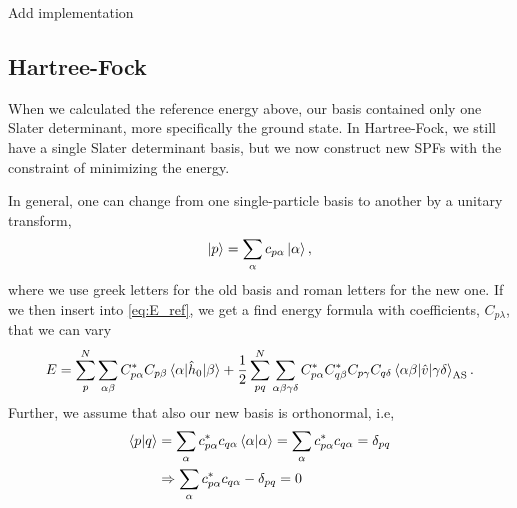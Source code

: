 Add implementation

\subsection{Hartree-Fock}
When we calculated the reference energy above, our basis contained only one Slater determinant, more specifically the ground state. In Hartree-Fock, we still have a single Slater determinant basis, but we now construct new SPFs with the constraint of minimizing the energy. 

In general, one can change from one single-particle basis to another by a unitary transform,
\begin{equation}
\ket{p}=\sum_{\alpha}c_{p\alpha}\ket{\alpha},
\end{equation}
where we use greek letters for the old basis and roman letters for the new one. If we then insert into \eqref{eq:E_ref}, we get a find energy formula with coefficients, $C_{p\lambda}$, that we can vary
\begin{equation}
E=\sum_{p}^N\sum_{\alpha\beta}C_{p\alpha}^*C_{p\beta}\mel{\alpha}{\hat{h}_0}{\beta}+\frac{1}{2}
\sum_{pq}^N\sum_{\alpha\beta\gamma\delta}C_{p\alpha}^*C_{q\beta}^*C_{p\gamma}C_{q\delta}\mel{\alpha\beta}{\hat{v}}{\gamma\delta}_{\text{AS}}.
\end{equation}
Further, we assume that also our new basis is orthonormal, i.e,
\begin{align}
\braket{p}{q}&=\sum_{\alpha}c_{p\alpha}^*c_{q\alpha}\braket{\alpha}{\alpha}=\sum_{\alpha}c_{p\alpha}^*c_{q\alpha}=\delta_{pq}\\
&\Rightarrow\sum_{\alpha}c_{p\alpha}^*c_{q\alpha}-\delta_{pq}=0\label{eq:constraint}
\end{align}

